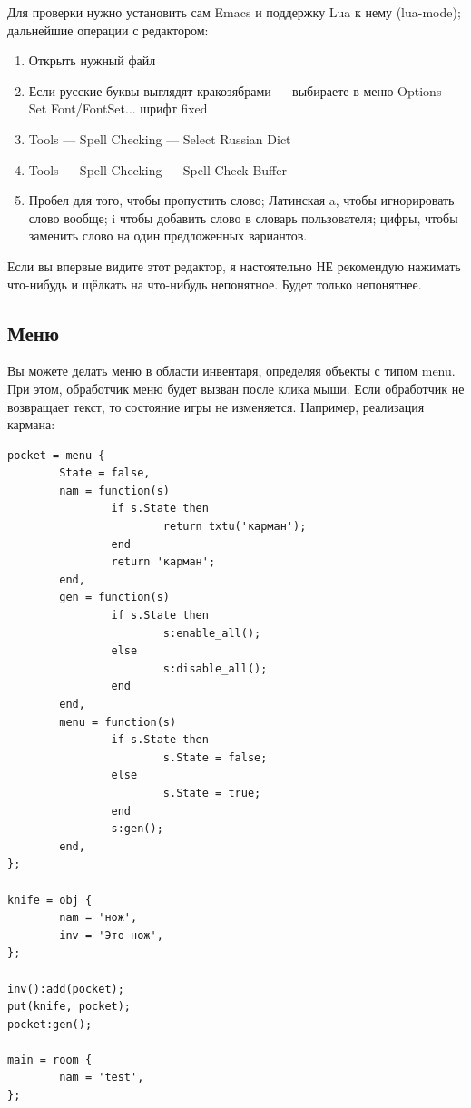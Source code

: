 \documentclass[a4paper,12pt]{article}
\begin{document}
Для проверки нужно установить сам Emacs и поддержку Lua к нему (lua-mode); дальнейшие операции с редактором:

\begin{enumerate}
\item Открыть нужный файл
\item Если русские буквы выглядят кракозябрами --- выбираете в меню Options --- Set Font/FontSet... шрифт fixed
\item Tools --- Spell Checking --- Select Russian Dict
\item Tools --- Spell Checking --- Spell-Check Buffer
\item Пробел для того, чтобы пропустить слово; Латинская a, чтобы игнорировать слово вообще; i чтобы добавить слово в словарь пользователя; цифры, чтобы заменить слово на один предложенных вариантов.
\end{enumerate}

Если вы впервые видите этот редактор, я настоятельно НЕ рекомендую нажимать что-нибудь и щёлкать на что-нибудь непонятное. Будет только непонятнее.

\subsection{Меню}
Вы можете делать меню в области инвентаря, определяя объекты с типом menu. При этом, обработчик меню будет вызван после клика мыши. Если обработчик не возвращает текст, то состояние игры не изменяется. Например, реализация кармана:

\begin{verbatim}
pocket = menu {
        State = false,
        nam = function(s)
                if s.State then
                        return txtu('карман');
                end
                return 'карман';
        end,
        gen = function(s)
                if s.State then
                        s:enable_all();
                else
                        s:disable_all();
                end
        end,
        menu = function(s)
                if s.State then
                        s.State = false;
                else
                        s.State = true;
                end
                s:gen();
        end,
};

knife = obj {
        nam = 'нож',
        inv = 'Это нож',
};

inv():add(pocket);
put(knife, pocket);
pocket:gen();

main = room {
        nam = 'test',
};
\end{verbatim}
\end{document}
